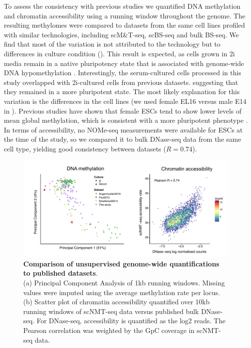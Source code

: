 To assess the consistency with previous studies we quantified DNA methylation and chromatin accessibility using a running window throughout the genome. The resulting methylomes were compared to datasets from the same cell lines profiled with similar technologies, including scM\&T-seq\cite{Angermueller2016}, scBS-seq\cite{Smallwood2014} and bulk BS-seq\cite{Ficz2013}. We find that most of the variation is not attributed to the technology but to differences in culture condition (). This result is expected, as cells grown in 2i media remain in a native pluripotency state that is associated with genome-wide DNA hypomethylation \cite{Ficz2013}. Interestingly, the serum-cultured cells processed in this study overlapped with 2i-cultured cells from previous datasets. suggesting that they remained in a more pluripotent state. The most likely explanation for this variation is the differences in the cell lines (we used female EL16 versus male E14 in \cite{Angermueller2016,Smallwood2014,Ficz2013}). Previous studies have shown that female ESCs tend to show lower levels of mean global methylation, which is consistent with a more pluripotent phenotype \cite{Zvetkova2005}.\\

In terms of accessibility, no NOMe-seq measurements were available for ESCs at the time of the study, so we compared it to bulk DNase-seq data from the same cell type, yielding good consistency between datasets ($R=0.74$).
\begin{figure}[H]
	\centering
	\includegraphics[width=1.0\linewidth]{scNMT_comparison}
	\caption[]{\textbf{Comparison of unsupervised genome-wide quantifications to published datasets}.\\
	(a) Principal Component Analysis of 1kb running windows. Missing values were imputed using the average methylation rate per locus.\\
	(b) Scatter plot of chromatin accessibility quantified over 10kb running windows of scNMT-seq data versus published bulk DNase-seq. For DNase-seq, accessibility is quantified as the log2 reads. The Pearson correlation was weighted by the GpC coverage in scNMT-seq data. }
	\label{fig:scnmt_comparison}
\end{figure}


